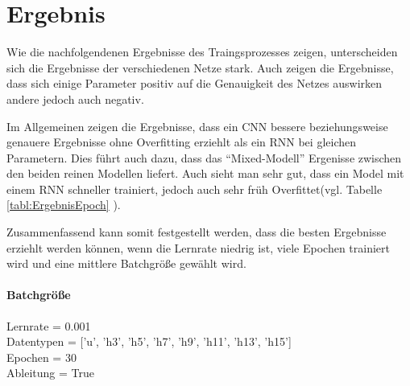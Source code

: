 \chapter{Ergebnis}

    Wie die nachfolgendenen Ergebnisse des Traingsprozesses zeigen, unterscheiden sich die Ergebnisse der verschiedenen Netze stark.
    Auch zeigen die Ergebnisse, dass sich einige Parameter positiv auf die Genauigkeit des Netzes auswirken andere jedoch auch negativ.
    \newline

    \noindent
    Im Allgemeinen zeigen die Ergebnisse, dass ein \ac{CNN} bessere beziehungsweise genauere Ergebnisse ohne Overfitting erziehlt als ein \ac{RNN} bei gleichen Parametern.
    Dies führt auch dazu, dass das "`Mixed-Modell"' Ergenisse zwischen den beiden reinen Modellen liefert.
    Auch sieht man sehr gut, dass ein Model mit einem \ac{RNN} schneller trainiert, jedoch auch sehr früh Overfittet(vgl. Tabelle \ref{tabl:ErgebnisEpoch} ).
    \newline

    \noindent
    Zusammenfassend kann somit festgestellt werden, dass die besten Ergebnisse erziehlt werden können, wenn die Lernrate niedrig ist, viele Epochen trainiert wird und eine mittlere Batchgröße gewählt wird.

    \subsubsection{Batchgröße}

        Lernrate = 0.001\\
        \noindent
        Datentypen = ['u', 'h3', 'h5', 'h7', 'h9', 'h11', 'h13', 'h15']\\
        \noindent
        Epochen = 30\\
        \noindent
        Ableitung = True\\


